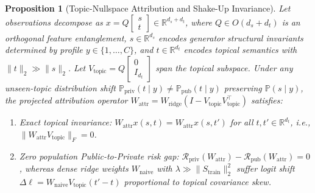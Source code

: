 \documentclass[11pt,a4paper]{article}
\newtheorem{proposition}{Proposition}
\begin{document}
\begin{proposition}[Topic-Nullspace Attribution and Shake-Up Invariance]
\label{prop:attribution}
Let observations decompose as $x = Q \begin{bmatrix} s \\ t \end{bmatrix} \in \mathbb{R}^{d_s + d_t}$, where $Q \in O(d_s + d_t)$ is an orthogonal feature entanglement, $s \in \mathbb{R}^{d_s}$ encodes generator structural invariants determined by profile $y \in \{1,\dots,C\}$, and $t \in \mathbb{R}^{d_t}$ encodes topical semantics with $\|t\|_2 \gg \|s\|_2$. Let $V_{\text{topic}} = Q \begin{bmatrix} 0 \\ I_{d_t} \end{bmatrix}$ span the topical subspace. Under any unseen-topic distribution shift $\mathbb{P}_{\text{priv}}(t \mid y) \neq \mathbb{P}_{\text{pub}}(t \mid y)$ preserving $\mathbb{P}(s \mid y)$, the projected attribution operator $W_{\text{attr}} = W_{\text{ridge}}(I - V_{\text{topic}} V_{\text{topic}}^\top)$ satisfies:
\begin{enumerate}
    \item Exact topical invariance: $W_{\text{attr}} x(s, t) = W_{\text{attr}} x(s, t')$ for all $t, t' \in \mathbb{R}^{d_t}$, i.e., $\|W_{\text{attr}} V_{\text{topic}}\|_F = 0$.
    \item Zero population Public-to-Private risk gap: $\mathcal{R}_{\text{priv}}(W_{\text{attr}}) - \mathcal{R}_{\text{pub}}(W_{\text{attr}}) = 0$, whereas dense ridge weights $W_{\text{naive}}$ with $\lambda \gg \|S_{\text{train}}\|_2^2$ suffer logit shift $\Delta \ell = W_{\text{naive}} V_{\text{topic}}(t' - t)$ proportional to topical covariance skew.
\end{enumerate}
\end{proposition}
\end{document}
